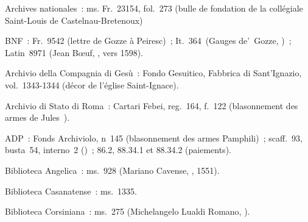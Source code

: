 \begin{teiElement}[name={TEI},change={commons\_edition}]
\begin{teiElement}[name={text},type={book},xmlid={book}]
\begin{teiElement}[name={group},type={book},xmlid={book-001}]
\begin{teiElement}[name={group},type={bibliography},data-page-title={Sources et bibliographie},data-include-href={Ch14\_Source\_bibliographie.xml},xmlid={bibliography-001}]
\begin{teiElement}[name={body}]
\begin{teiDiv}[type={section1},xmlid={section1-040}]
\begin{teiDiv}[type={section2},xmlid={section2-025}]
              \begin{teiBibl}[xmlid={bibl-022}]
Archives nationales : ms. Fr. 23154, fol. 273 (bulle de fondation de la collégiale Saint-Louis de Castelnau-Bretenoux)
\end{teiBibl}
              \begin{teiBibl}[xmlid={bibl-023}]
BNF : Fr. 9542 (lettre de Gozze à Peiresc) ; It. 364 (Gauges de’ Gozze, ) ; Latin 8971 (Jean Bœuf, , vers 1598).
\end{teiBibl}
            
\end{teiDiv}
            \begin{teiDiv}[type={section2},xmlid={section2-026}]

              \begin{teiBibl}[xmlid={bibl-024}]
Archivio della Compagnia di Gesù : Fondo Gesuitico, Fabbrica di Sant’Ignazio, vol. 1343-1344 (décor de l’église Saint-Ignace).
\end{teiBibl}
              \begin{teiBibl}[xmlid={bibl-025}]
Archivio di Stato di Roma : Cartari Febei, reg. 164, f. 122 (blasonnement des armes de Jules ).
\end{teiBibl}
              \begin{teiBibl}[xmlid={bibl-026}]
ADP : Fonds Archiviolo, n 145 (blasonnement des armes Pamphili) ; scaff. 93, busta 54, interno 2 () ; 86.2, 88.34.1 et 88.34.2 (paiements).
\end{teiBibl}
              \begin{teiBibl}[xmlid={bibl-027}]
Biblioteca Angelica : ms. 928 (Mariano Cavense, , 1551).
\end{teiBibl}
              \begin{teiBibl}[xmlid={bibl-028}]
Biblioteca Casanatense : ms. 1335.
\end{teiBibl}
              \begin{teiBibl}[xmlid={bibl-029}]
Biblioteca Corsiniana : ms. 275 (Michelangelo Lualdi Romano, ).
\end{teiBibl}
            

\end{teiDiv}
\end{teiDiv}
\end{teiElement}
\end{teiElement}
\end{teiElement}
\end{teiElement}
\end{teiElement}
